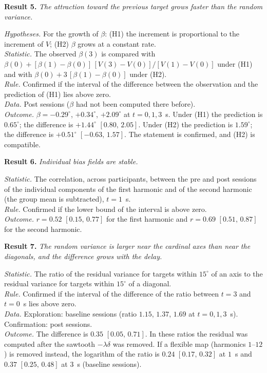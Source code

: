 \documentclass[10pt,a4paper]{article}
\newcommand{\dg}{^{\circ}}
\newcommand{\ci}[2]{$[#1,\,#2]$}
\newcommand{\res}[1]{\textbf{Result #1.}}
\newcommand{\hyp}{\emph{Hypotheses.} }
\newcommand{\stat}{\emph{Statistic.} }
\newcommand{\rul}{\emph{Rule.} }
\newcommand{\dat}{\emph{Data.} }
\newcommand{\outc}{\emph{Outcome.} }
\begin{document}
\res{5} \emph{The attraction toward the previous target grows faster than the random variance.}

\hyp For the growth of $\beta$: (H1) the increment is proportional to the increment of $V$; (H2) $\beta$
grows at a constant rate.\\
\stat The observed $\beta(3)$ is compared with $\beta(0)+[\beta(1)-\beta(0)]\,[V(3)-V(0)]/[V(1)-V(0)]$ under
(H1) and with $\beta(0)+3\,[\beta(1)-\beta(0)]$ under (H2).\\
\rul Confirmed if the interval of the difference between the observation and the prediction of (H1) lies
above zero.\\
\dat Post sessions ($\beta$ had not been computed there before).\\
\outc $\beta=-0.29\dg$, $+0.34\dg$, $+2.09\dg$ at $t=0,1,3$~s. Under (H1) the prediction is $0.65\dg$; the
difference is $+1.44\dg$ \ci{0.80}{2.05}. Under (H2) the prediction is $1.59\dg$; the difference is $+0.51\dg$
\ci{-0.63}{1.57}. The statement is confirmed, and (H2) is compatible.

\res{6} \emph{Individual bias fields are stable.}

\stat The correlation, across participants, between the pre and post sessions of the individual components of
the first harmonic and of the second harmonic (the group mean is subtracted), $t=1$~s.\\
\rul Confirmed if the lower bound of the interval is above zero.\\
\outc $r=0.52$ \ci{0.15}{0.77} for the first harmonic and $r=0.69$ \ci{0.51}{0.87} for the second harmonic.

\res{7} \emph{The random variance is larger near the cardinal axes than near the diagonals, and the difference
grows with the delay.}

\stat The ratio of the residual variance for targets within $15\dg$ of an axis to the residual variance for
targets within $15\dg$ of a diagonal.\\
\rul Confirmed if the interval of the difference of the ratio between $t=3$ and $t=0$~s lies above zero.\\
\dat Exploration: baseline sessions (ratio $1.15$, $1.37$, $1.69$ at $t=0,1,3$~s). Confirmation: post
sessions.\\
\outc The difference is $0.35$ \ci{0.05}{0.71}. In these ratios the residual was computed after the sawtooth
$-\lambda\delta$ was removed. If a flexible map (harmonics $1$--$12$) is removed instead, the logarithm of the
ratio is $0.24$ \ci{0.17}{0.32} at $1$~s and $0.37$ \ci{0.25}{0.48} at $3$~s (baseline sessions).
\end{document}
